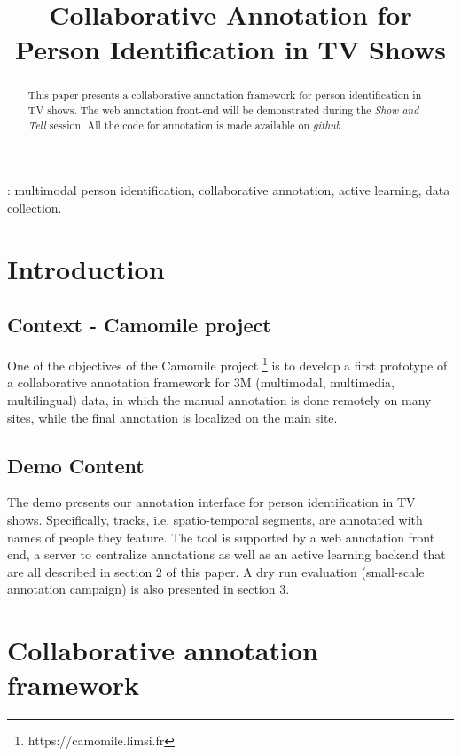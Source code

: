 \documentclass[a4paper]{article}
\title{Collaborative Annotation for Person Identification in TV Shows}
\begin{document}
  \maketitle
  \begin{abstract}
This paper presents a collaborative annotation framework for person identification in TV shows. The web annotation front-end will be demonstrated during the \textit{Show and Tell} session. All the code for annotation is made available on \textit{github}.
  \end{abstract}
  : multimodal person identification, collaborative annotation, active learning, data collection.

  \section{Introduction}
      \subsection{Context - Camomile project}
One of the objectives of the Camomile project \footnote{https://camomile.limsi.fr} is to develop a first prototype of a collaborative annotation framework for 3M (multimodal, multimedia, multilingual) data, in which the manual annotation is done remotely on many sites, while the final annotation is localized on the main site. 

        \vspace{-0.2cm}
 \subsection{Demo Content}
The demo presents our annotation interface for person identification in TV shows. Specifically, tracks, i.e. spatio-temporal segments, are annotated with names of people they feature. The tool is supported by a web annotation front end, a server to centralize annotations as well as an active learning backend that are all described in section 2 of this paper. A dry run evaluation (small-scale annotation campaign) is also presented in section 3.


      \section{Collaborative annotation framework}
\end{document}
